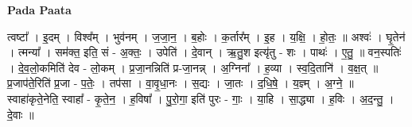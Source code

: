 \documentclass[17pt]{extarticle}
\begin{document}
\textbf{Pada Paata} \newline

त्वष्टा᳚ । इ॒दम् । विश्व᳚म् । भुव॑नम् । ज॒जा॒न॒ । ब॒होः । क॒र्तार᳚म् । इ॒ह । य॒क्षि॒ । हो॒तः॒ ॥ अश्वः॑ । घृ॒तेन॑ । त्मन्या᳚ । सम॑क्त॒ इति॒ सं - अ॒क्तः॒ । उपेति॑ । दे॒वान् । ऋ॒तु॒श इत्यृ॑तु - शः । पाथः॑ । ए॒तु॒ ॥ वन॒स्पतिः॑ । दे॒व॒लो॒कमिति॑ देव - लो॒कम् । प्र॒जा॒नन्निति॑ प्र-जा॒नन्न् । अ॒ग्निना᳚ । ह॒व्या । स्व॒दि॒तानि॑ । व॒क्ष॒त् ॥ प्र॒जाप॑ते॒रिति॑ प्र॒जा - प॒तेः॒ । तप॑सा । वा॒वृ॒धा॒नः । स॒द्यः । जा॒तः । द॒धि॒षे॒ । य॒ज्ञ्म् । अ॒ग्ने॒ ॥ स्वाहा॑कृते॒नेति॒ स्वाहा᳚ - कृ॒ते॒न॒ । ह॒विषा᳚ । पु॒रो॒गा॒ इति॑ पुरः - गाः॒ । या॒हि । सा॒द्ध्या । ह॒विः । अ॒द॒न्तु॒ । दे॒वाः ॥  \newline
\end{document}
